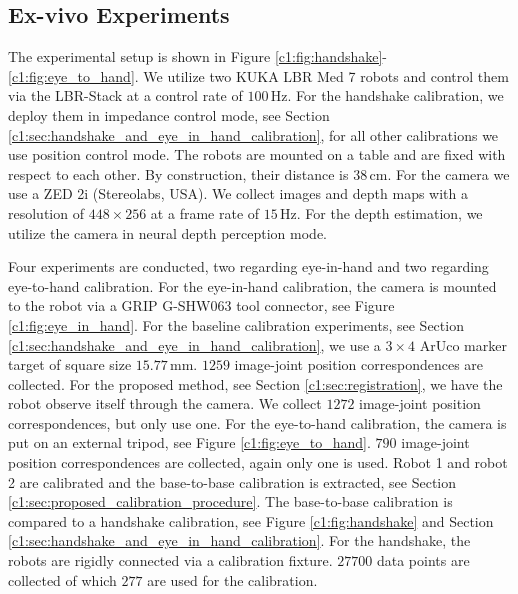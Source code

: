 \subsection{Ex-vivo Experiments}
The experimental setup is shown in Figure \ref{c1:fig:handshake}-\ref{c1:fig:eye_to_hand}. We utilize two KUKA LBR Med 7 robots and control them via the LBR-Stack \cite{huber2023lbr} at a control rate of $100\,\text{Hz}$. For the handshake calibration, we deploy them in impedance control mode, see Section \ref{c1:sec:handshake_and_eye_in_hand_calibration}, for all other calibrations we use position control mode. The robots are mounted on a table and are fixed with respect to each other. By construction, their distance is $38\,\text{cm}$. For the camera we use a ZED 2i (Stereolabs, USA). We collect images and depth maps with a resolution of $448 \times 256$ at a frame rate of $15\,\text{Hz}$. For the depth estimation, we utilize the camera in neural depth perception mode.

Four experiments are conducted, two regarding eye-in-hand and two regarding eye-to-hand calibration. For the eye-in-hand calibration, the camera is mounted to the robot via a GRIP G-SHW063 tool connector, see Figure \ref{c1:fig:eye_in_hand}. For the baseline calibration experiments, see Section \ref{c1:sec:handshake_and_eye_in_hand_calibration}, we use a $3\times4$ ArUco marker target of square size $15.77\,\text{mm}$. $1259$ image-joint position correspondences are collected. For the proposed method, see Section \ref{c1:sec:registration}, we have the robot observe itself through the camera. We collect $1272$ image-joint position correspondences, but only use one. For the eye-to-hand calibration, the camera is put on an external tripod, see Figure \ref{c1:fig:eye_to_hand}. $790$ image-joint position correspondences are collected, again only one is used. Robot 1 and robot 2 are calibrated and the base-to-base calibration is extracted, see Section \ref{c1:sec:proposed_calibration_procedure}. The base-to-base calibration is compared to a handshake calibration, see Figure \ref{c1:fig:handshake} and Section \ref{c1:sec:handshake_and_eye_in_hand_calibration}. For the handshake, the robots are rigidly connected via a calibration fixture. $27700$ data points are collected of which $277$ are used for the calibration.

